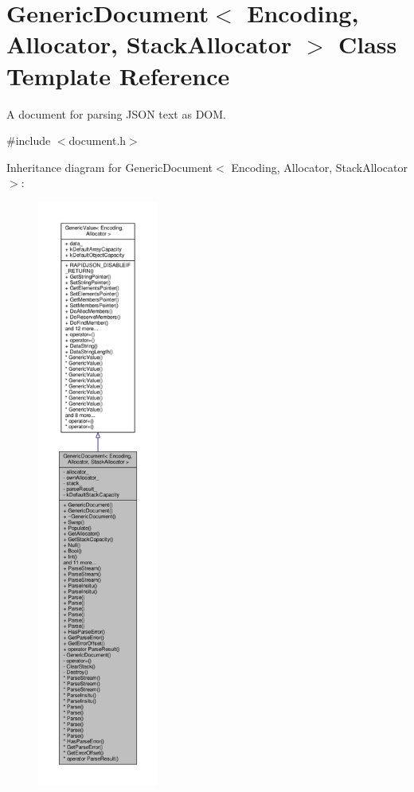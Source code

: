 \hypertarget{classGenericDocument}{}\section{Generic\+Document$<$ Encoding, Allocator, Stack\+Allocator $>$ Class Template Reference}
\label{classGenericDocument}


A document for parsing J\+S\+ON text as D\+OM.  




{\ttfamily \#include $<$document.\+h$>$}



Inheritance diagram for Generic\+Document$<$ Encoding, Allocator, Stack\+Allocator $>$\+:
\nopagebreak
\begin{figure}[H]
\begin{center}
\leavevmode
\includegraphics[height=550pt]{classGenericDocument__inherit__graph}
\end{center}
\end{figure}


